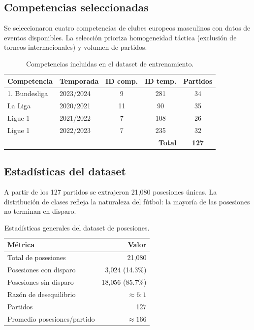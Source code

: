 \documentclass[12pt,a4paper]{article}
\begin{document}
\subsection{Competencias seleccionadas}

Se seleccionaron cuatro competencias de clubes europeos masculinos con datos de eventos
disponibles. La selección prioriza homogeneidad táctica (exclusión de torneos
internacionales) y volumen de partidos.

\begin{table}[H]
\centering
\caption{Competencias incluidas en el dataset de entrenamiento.}
\begin{tabular}{llccc}
\toprule
\textbf{Competencia} & \textbf{Temporada} & \textbf{ID comp.} & \textbf{ID temp.} & \textbf{Partidos} \\
\midrule
1. Bundesliga & 2023/2024 & 9  & 281 & 34 \\
La Liga       & 2020/2021 & 11 & 90  & 35 \\
Ligue 1       & 2021/2022 & 7  & 108 & 26 \\
Ligue 1       & 2022/2023 & 7  & 235 & 32 \\
\midrule
\multicolumn{4}{r}{\textbf{Total}} & \textbf{127} \\
\bottomrule
\end{tabular}
\label{tab:competitions}
\end{table}

\subsection{Estadísticas del dataset}

A partir de los 127 partidos se extrajeron 21{,}080 posesiones únicas. La distribución
de clases refleja la naturaleza del fútbol: la mayoría de las posesiones no terminan
en disparo.

\begin{table}[H]
\centering
\caption{Estadísticas generales del dataset de posesiones.}
\begin{tabular}{lr}
\toprule
\textbf{Métrica} & \textbf{Valor} \\
\midrule
Total de posesiones      & 21{,}080 \\
Posesiones con disparo   & 3{,}024 (14.3\%) \\
Posesiones sin disparo   & 18{,}056 (85.7\%) \\
Razón de desequilibrio   & $\approx 6:1$ \\
Partidos                 & 127 \\
Promedio posesiones/partido & $\approx 166$ \\
\bottomrule
\end{tabular}
\label{tab:dataset_stats}
\end{table}
\end{document}
